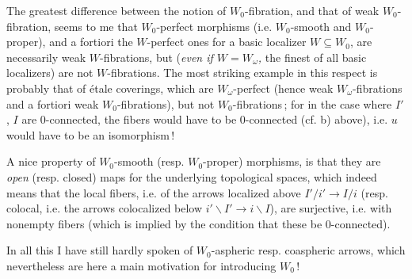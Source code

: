 The greatest difference between the notion of $W_0$-fibration, and that of weak $W_0$-fibration, seems to me that $W_0$-perfect morphisms (i.e. $W_0$-smooth and $W_0$-proper), and a fortiori the $W$-perfect ones for a basic localizer $W \subseteq W_0$, are necessarily weak $W$-fibrations, but (\textit{even if $W = W_\omega$,} the finest of all basic localizers) are not $W$-fibrations. The most striking example in this respect is probably that of étale coverings, which are $W_\omega$-perfect (hence
weak $W_\omega$-fibrations and a fortiori weak $W_0$-fibrations), but not $W_0$-fibrations\,; for in the case where $I'$, $I$ are 0-connected, the fibers would have to be 0-connected (cf. b) above), i.e. $u$ would have to be an isomorphism\,!

A nice property of $W_0$-smooth (resp. $W_0$-proper) morphisms, is that they are \textit{open} (resp. closed) maps for the underlying topological spaces, which indeed means that the local fibers, i.e. of the arrows localized above $I'/i' \longrightarrow I/i$ (resp. colocal, i.e. the arrows colocalized below $i'\backslash I' \longrightarrow i\backslash I$), are surjective, i.e. with nonempty fibers (which is implied by the condition that these be 0-connected).

In all this I have still hardly spoken of $W_0$-aspheric resp. coaspheric arrows, which nevertheless are here a main motivation for introducing $W_0$\,!

